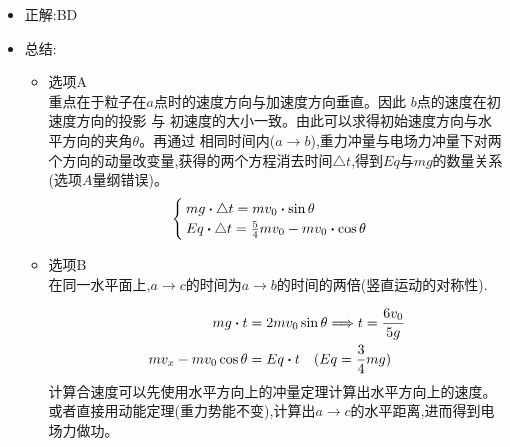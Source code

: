 \documentclass{article}
\begin{document}
\begin{itemize}
    \item 正解:\quad BD
    \item 总结:\quad
          \begin{itemize}
              \item 选项A \\
                    重点在于粒子在$a$点时的速度方向与加速度方向垂直。因此 \quad $b$点的速度在初速度方向的投影 \quad 与 \quad 初速度的大小一致。由此可以求得初始速度方向与水平方向的夹角$\theta$。再通过
                    相同时间内($a \rightarrow b$),重力冲量与电场力冲量下对两个方向的动量改变量,获得的两个方程消去时间$\triangle t$,得到$Eq$与$mg$的数量关系(选项$A$量纲错误)。
                    $$
                        \begin{cases}
                            mg \vdot \triangle t = m v_{0} \vdot \sin{\theta} \\
                            Eq \vdot \triangle t = \frac{5}{4} m v_{0} - m v_{0} \vdot \cos{\theta}
                        \end{cases}
                    $$

              \item 选项B \\
                    在同一水平面上,$a \rightarrow c$的时间为$a \rightarrow b$的时间的两倍(竖直运动的对称性).

                    \begin{align*}
                        mg \vdot t                     & = 2 m v_{0} \sin{\theta} \lra t = \frac{6 v_{0}}{5 g} \\
                        m v_{x} - m v_{0} \cos{\theta} & = Eq \vdot t \quad (Eq = \frac{3}{4} mg)
                    \end{align*}
                    计算合速度可以先使用水平方向上的冲量定理计算出水平方向上的速度。或者直接用动能定理(重力势能不变),计算出$a \rightarrow c$的水平距离,进而得到电场力做功。
          \end{itemize}
\end{itemize}

\vspace{2em}
\end{document}

